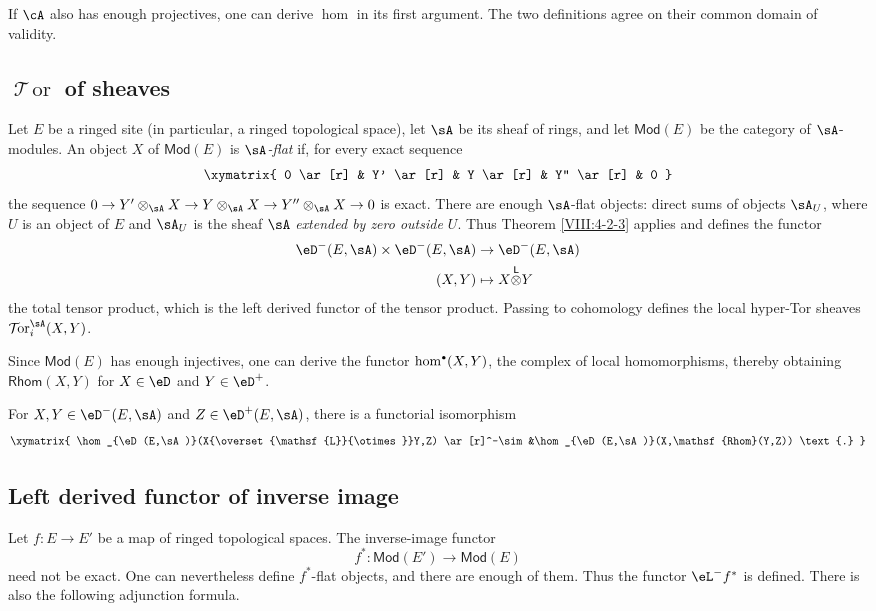 \documentclass[12pt,oneside,english]{smfbook}
\DeclareMathOperator{\Tor}{\mathcal{T}\!or} %
\newcommand{\lotimes}{{\overset{\mathsf{L}}{\otimes}}}
\let\oldbullet\bullet
\renewcommand{\bullet}{\textnormal{\tiny$\oldbullet$}}
\begin{document}
If $\cA$ also has enough projectives, one can derive $\hom$ in its first argument. The two definitions agree on their common domain of validity.

\subsection{\texorpdfstring{$\Tor$}{Tor} of sheaves}\label{VIII:6-2}

Let $E$ be a ringed site (in particular, a ringed topological space), let $\sA$ be its sheaf of rings, and let $\mathsf{Mod}(E)$ be the category of $\sA$-modules. An object $X$ of $\mathsf{Mod}(E)$ is \emph{$\sA$-flat} if, for every exact sequence
\[\xymatrix{
  0 \ar[r]
    & Y' \ar[r]
    & Y \ar[r]
    & Y'' \ar[r]
    & 0
}\]
the sequence $0\to Y'\otimes_\sA X\to Y\otimes_\sA X\to Y''\otimes_\sA X\to0$ is exact. There are enough $\sA$-flat objects: direct sums of objects $\sA_U$, where $U$ is an object of $E$ and $\sA_U$ is the sheaf $\sA$ \emph{extended by zero outside $U$}. Thus Theorem \ref{VIII:4-2-3} applies and defines the functor
\begin{align*}
  \eD^-(E,\sA) \times \eD^-(E,\sA) &\to \eD^-(E,\sA) \\
  (X,Y) &\mapsto X\lotimes Y
\end{align*}
the total tensor product, which is the left derived functor of the tensor product. Passing to cohomology defines the local hyper-Tor sheaves $\Tor_i^\sA(X,Y)$.

Since $\mathsf{Mod}(E)$ has enough injectives, one can derive the functor $\hom^\bullet(X,Y)$, the complex of local homomorphisms, thereby obtaining $\mathsf{Rhom}(X,Y)$ for $X\in\eD$ and $Y\in\eD^+$.

For $X,Y\in\eD^-(E,\sA)$ and $Z\in\eD^+(E,\sA)$, there is a functorial isomorphism
\[\xymatrix{
  \hom_{\eD(E,\sA)}(X\lotimes Y,Z) \ar[r]^-\sim
    &\hom_{\eD(E,\sA)}(X,\mathsf{Rhom}(Y,Z)) \text{.}
}\]

\subsection{Left derived functor of inverse image}\label{VIII:6-3}

Let $f:E\to E'$ be a map of ringed topological spaces. The inverse-image functor
\[
  f^\ast:\mathsf{Mod}(E') \to \mathsf{Mod}(E)
\]
need not be exact. One can nevertheless define $f^\ast$-flat objects, and there are enough of them. Thus the functor $\eL^-f^\ast$ is defined. There is also the following adjunction formula.
\end{document}
